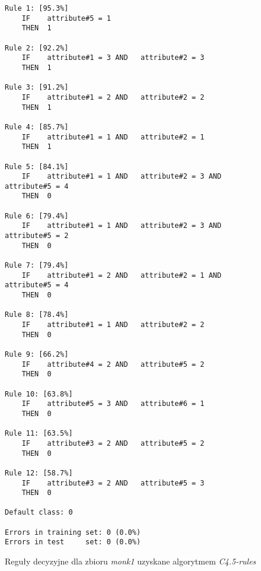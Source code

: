 \begin{figure}
\begin{verbatim}
Rule 1: [95.3%]
    IF    attribute#5 = 1
    THEN  1

Rule 2: [92.2%]
    IF    attribute#1 = 3 AND   attribute#2 = 3
    THEN  1

Rule 3: [91.2%]
    IF    attribute#1 = 2 AND   attribute#2 = 2
    THEN  1

Rule 4: [85.7%]
    IF    attribute#1 = 1 AND   attribute#2 = 1
    THEN  1

Rule 5: [84.1%]
    IF    attribute#1 = 1 AND   attribute#2 = 3 AND   attribute#5 = 4
    THEN  0

Rule 6: [79.4%]
    IF    attribute#1 = 1 AND   attribute#2 = 3 AND   attribute#5 = 2
    THEN  0

Rule 7: [79.4%]
    IF    attribute#1 = 2 AND   attribute#2 = 1 AND   attribute#5 = 4
    THEN  0

Rule 8: [78.4%]
    IF    attribute#1 = 1 AND   attribute#2 = 2
    THEN  0

Rule 9: [66.2%]
    IF    attribute#4 = 2 AND   attribute#5 = 2
    THEN  0

Rule 10: [63.8%]
    IF    attribute#5 = 3 AND   attribute#6 = 1
    THEN  0

Rule 11: [63.5%]
    IF    attribute#3 = 2 AND   attribute#5 = 2
    THEN  0

Rule 12: [58.7%]
    IF    attribute#3 = 2 AND   attribute#5 = 3
    THEN  0

Default class: 0

Errors in training set: 0 (0.0%)
Errors in test     set: 0 (0.0%)
\end{verbatim}
\caption{Reguły decyzyjne dla zbioru \emph{monk1} uzyskane algorytmem \emph{C4.5-rules}}
\label{p2t2-monk-rules-c45}
\end{figure}